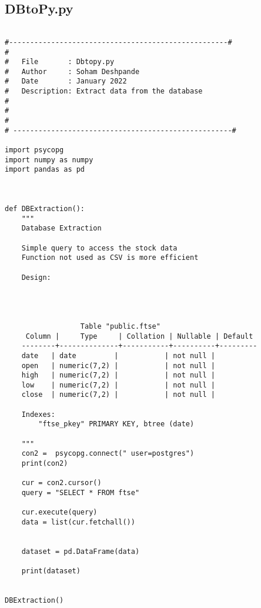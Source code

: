 \documentclass{article}
\begin{document}
\subsection{DBtoPy.py}
\begin{lstlisting}

#----------------------------------------------------#
#
#   File       : Dbtopy.py
#   Author     : Soham Deshpande
#   Date       : January 2022
#   Description: Extract data from the database
#
#
#
# ----------------------------------------------------#

import psycopg
import numpy as numpy
import pandas as pd



def DBExtraction():
    """
    Database Extraction

    Simple query to access the stock data
    Function not used as CSV is more efficient

    Design:




                  Table "public.ftse"
     Column |     Type     | Collation | Nullable | Default
    --------+--------------+-----------+----------+---------
    date   | date         |           | not null |
    open   | numeric(7,2) |           | not null |
    high   | numeric(7,2) |           | not null |
    low    | numeric(7,2) |           | not null |
    close  | numeric(7,2) |           | not null |

    Indexes:
        "ftse_pkey" PRIMARY KEY, btree (date)

    """
    con2 =  psycopg.connect(" user=postgres")
    print(con2)

    cur = con2.cursor()
    query = "SELECT * FROM ftse"

    cur.execute(query)
    data = list(cur.fetchall())


    dataset = pd.DataFrame(data)

    print(dataset)


DBExtraction()



\end{lstlisting}

\clearpage
\end{document}
